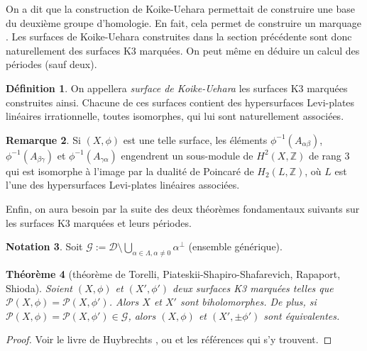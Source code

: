 \documentclass[JEP,XML,SOM,Unicode,francais,published]{cedram}
\newcommand{\Z}{\mathbb{Z}}
\newtheorem{thm}{Théorème}
\theoremstyle{definition}
\newtheorem{rem}[thm]{Remarque}
\newtheorem{defn}[thm]{Définition}
\newtheorem{notation}[thm]{Notation}
\begin{document}
On a dit que la construction de Koike-Uehara permettait de construire une base du deuxième groupe d'homologie. En fait, cela permet de construire un marquage \hbox{\cite[\S\,3]{koike2019gluing}}. Les surfaces de Koike-Uehara construites dans la section précédente sont donc naturellement des surfaces K3 marquées. On peut même en déduire un calcul des périodes (sauf deux).

\begin{defn}
On appellera \emph{surface de Koike-Uehara} les surfaces K3 marquées construites ainsi. Chacune de ces surfaces contient des hypersurfaces Levi-plates linéaires irrationnelle, toutes isomorphes, qui lui sont naturellement associées.
\end{defn}

\begin{rem}\label{rem:homologie-hlpl}
Si $(X, \phi)$ est une telle surface, les éléments $\phi^{-1}(A_{\alpha\beta})$, $\phi^{-1}(A_{\beta\gamma})$ et $\phi^{-1}(A_{\gamma\alpha})$ engendrent un sous-module de $H^2(X, \Z)$ de rang $3$ \cite[\S\,3.1]{koike2019gluing} qui est isomorphe à l'image par la dualité de Poincaré de $H_2(L, \Z)$, où $L$ est l'une des hypersurfaces Levi-plates linéaires associées.
\end{rem}

Enfin, on aura besoin par la suite des deux théorèmes fondamentaux suivants sur les surfaces K3 marquées et leurs périodes.
\begin{notation}
\label{notation-generique}
Soit $\mathscr{G}:= \mathscr{D}\setminus\bigcup_{\alpha \in \Lambda, \alpha \neq 0} \alpha^\perp$ (\og ensemble générique\fg).
\end{notation}

\begin{thm}[\og théorème de Torelli\fg, Piateskii-Shapiro-Shafarevich, Rapaport, Shioda]
\label{torelli}
Soient $(X, \phi)$ et $(X', \phi')$ deux surfaces K3 marquées telles que $\mathscr{P}(X, \phi) = \mathscr{P}(X, \phi')$. Alors $X$ et $X'$ sont biholomorphes. De plus, si $\mathscr{P}(X, \phi) = \mathscr{P}(X, \phi') \in \mathscr{G}$, alors $(X, \phi)$ et $(X', \pm\phi')$ sont équivalentes.
\end{thm}
\begin{proof}Voir le livre de Huybrechts \cite[chap.\,7, prop.\,2.1 \& 2.2, rem.\,5.2]{huybrechts_2016}, ou \cite[chap.\,VIII]{BHPV} et les références qui s'y trouvent.
\end{proof}
\end{document}
